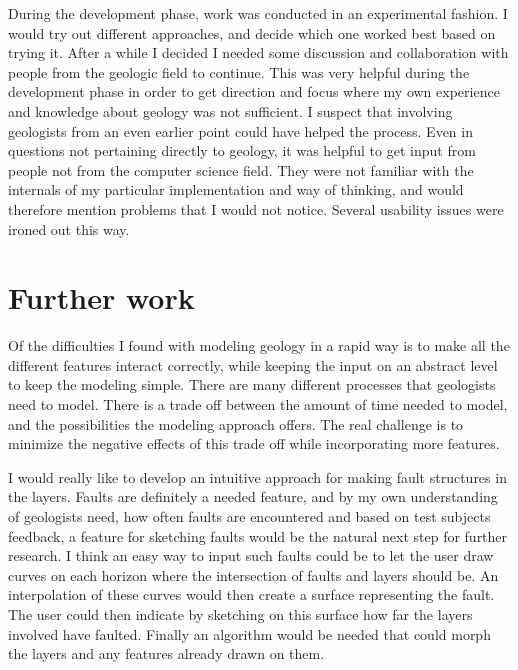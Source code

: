 \documentclass[a4paper,12pt]{report}
\begin{document}
During the development phase, work was conducted in an experimental fashion. I would try out different approaches, and decide which one worked best based on trying it. After a while I decided I needed some discussion and collaboration with people from the geologic field to continue. This was very helpful during the development phase in order to get direction and focus where my own experience and knowledge about geology was not sufficient. I suspect that involving geologists from an even earlier point could have helped the process. Even in questions not pertaining directly to geology, it was helpful to get input from people not from the computer science field. They were not familiar with the internals of my particular implementation and way of thinking, and would therefore mention problems that I would not notice. Several usability issues were ironed out this way.





\clearpage
\chapter{Further work}
\label{sec:further}

Of the difficulties I found with modeling geology in a rapid way is to make all the different features interact correctly, while keeping the input on an abstract level to keep the modeling simple. There are many different processes that geologists need to model. There is a trade off between the amount of time needed to model, and the possibilities the modeling approach offers. The real challenge is to minimize the negative effects of this trade off while incorporating more features.

I would really like to develop an intuitive approach for making fault structures in the layers. Faults are definitely a needed feature, and by my own understanding of geologists need, how often faults are encountered and based on test subjects feedback, a feature for sketching faults would be the natural next step for further research. I think an easy way to input such faults could be to let the user draw curves on each horizon where the intersection of faults and layers should be. An interpolation of these curves would then create a surface representing the fault. The user could then indicate by sketching on this surface how far the layers involved have faulted. Finally an algorithm would be needed that could morph the layers and any features already drawn on them.
\end{document}
